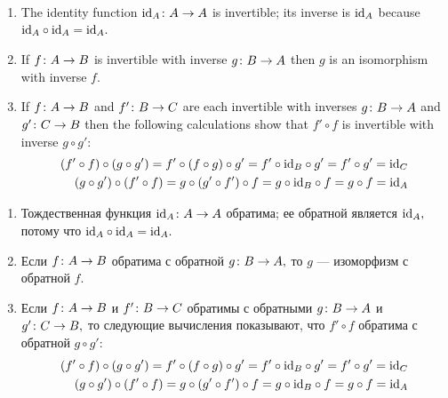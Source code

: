 \documentclass[CT4S-EN-RU]{subfiles}
\begin{document}
\begin{proofENG}
\begin{enumerate}
\item The identity function $\textnormal{id}_A\colon A\rightarrow A$ is invertible; its inverse is $\textnormal{id}_A$ because $\textnormal{id}_A\circ\textnormal{id}_A=\textnormal{id}_A.$
\item If $f\colon A\rightarrow B$ is invertible with inverse $g\colon B\rightarrow A$ then $g$ is an isomorphism with inverse $f.$
\item If $f\colon A\rightarrow B$ and $f'\colon B\rightarrow C$ are each invertible with inverses $g\colon B\rightarrow A$ and $g'\colon C\rightarrow B$ then the following calculations show that $f'\circ f$ is invertible with inverse $g\circ g'$: 
\begin{align*}
(f'\circ f)\circ(g\circ g')=f'\circ(f\circ g)\circ g'=f'\circ\textnormal{id}_B\circ g'=f'\circ g'=\textnormal{id}_C\\
(g\circ g')\circ(f'\circ f)=g\circ(g'\circ f')\circ f=g\circ\textnormal{id}_B\circ f=g\circ f=\textnormal{id}_A
\end{align*}
\end{enumerate}
\end{proofENG}

\begin{proofRUS}
\begin{enumerate}
\item Тождественная функция $\textnormal{id}_A\colon A\rightarrow A$ обратима; ее обратной является $\textnormal{id}_A,$ потому что $\textnormal{id}_A\circ\textnormal{id}_A=\textnormal{id}_A.$
\item Если $f\colon A\rightarrow B$ обратима с обратной $g\colon B\rightarrow A,$ то $g$ — изоморфизм с обратной $f.$
\item Если $f\colon A\rightarrow B$ и $f'\colon B\rightarrow C$ обратимы с обратными $g\colon B\rightarrow A$ и $g'\colon C\rightarrow B,$ то следующие вычисления показывают, что $f'\circ f$ обратима с обратной $g\circ g'$: 
\begin{align*}
(f'\circ f)\circ(g\circ g')=f'\circ(f\circ g)\circ g'=f'\circ\textnormal{id}_B\circ g'=f'\circ g'=\textnormal{id}_C\\
(g\circ g')\circ(f'\circ f)=g\circ(g'\circ f')\circ f=g\circ\textnormal{id}_B\circ f=g\circ f=\textnormal{id}_A
\end{align*}
\end{enumerate}
\end{proofRUS}
\end{document}
